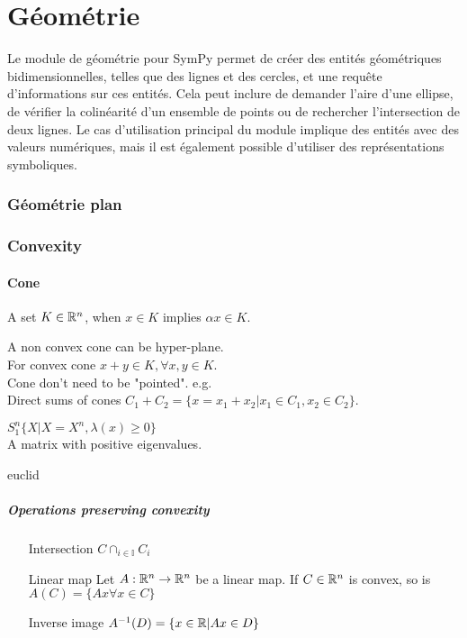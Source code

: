 \part{Géométrie}
Le module de géométrie pour SymPy permet de créer des entités géométriques bidimensionnelles, telles que des lignes et des cercles, et une requête d'informations sur ces entités. Cela peut inclure de demander l’aire d’une ellipse, de vérifier la colinéarité d’un ensemble de points ou de rechercher l’intersection de deux lignes. Le cas d'utilisation principal du module implique des entités avec des valeurs numériques, mais il est également possible d'utiliser des représentations symboliques.
\section{Géométrie plan}
\section{Convexity}
\subsection{Cone}
\begin{definition}[Cone]
A set $K \in \mathbb{R}^n$, when $x \in K $ implies $\alpha x \in K$.
\end{definition}
A non convex cone can be hyper-plane.\\
For convex cone $x + y \in K, \forall x,y \in K$.\\
Cone don't need to be "pointed". e.g. \\
Direct sums of cones $C_1 + C_2 = \{ x = x_1+x_2 | x_1 \in C_1, x_2 \in C_2 \}$.\\
\begin{example}
$S_1^n  \{ X | X=X^n ,\lambda(x) \ge 0\}$\\
A matrix with positive eigenvalues.
\end{example}euclid

\subsubsection{Operations preserving convexity}
\begin{itemize}
\item[Intersection] $C  \cap_{i \in \mathbb{I}}C_i$
\item[Linear map] Let $A : \mathbb{R}^n \to  \mathbb{R}^n$ be a linear map. If $C \in \mathbb{R}^n$ is convex, so is $A(C) = \{Ax \forall x \in C \}$
\item[Inverse image] $A^{-1}(D) = \{ x \in \mathbb{R} |Ax \in D \}$
\end{itemize}

